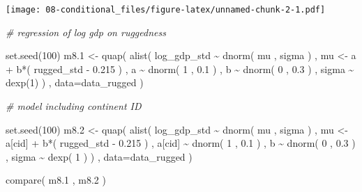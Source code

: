 \documentclass[
]{book}
\newenvironment{Shaded}{\begin{snugshade}}{\end{snugshade}}
\newcommand{\AttributeTok}[1]{\textcolor[rgb]{0.77,0.63,0.00}{#1}}
\newcommand{\CommentTok}[1]{\textcolor[rgb]{0.56,0.35,0.01}{\textit{#1}}}
\newcommand{\DecValTok}[1]{\textcolor[rgb]{0.00,0.00,0.81}{#1}}
\newcommand{\FloatTok}[1]{\textcolor[rgb]{0.00,0.00,0.81}{#1}}
\newcommand{\FunctionTok}[1]{\textcolor[rgb]{0.00,0.00,0.00}{#1}}
\newcommand{\NormalTok}[1]{#1}
\newcommand{\OtherTok}[1]{\textcolor[rgb]{0.56,0.35,0.01}{#1}}
\newcommand{\SpecialCharTok}[1]{\textcolor[rgb]{0.00,0.00,0.00}{#1}}
\begin{document}
\texttt{[image: 08-conditional\_files/figure-latex/unnamed-chunk-2-1.pdf]}

\begin{Shaded}
\begin{Highlighting}[]
\CommentTok{\# regression of log gdp on ruggedness}

\FunctionTok{set.seed}\NormalTok{(}\DecValTok{100}\NormalTok{)}
\NormalTok{m8}\FloatTok{.1} \OtherTok{\textless{}{-}} \FunctionTok{quap}\NormalTok{( }\FunctionTok{alist}\NormalTok{(}
\NormalTok{log\_gdp\_std }\SpecialCharTok{\textasciitilde{}} \FunctionTok{dnorm}\NormalTok{( mu , sigma ) , }
\NormalTok{mu }\OtherTok{\textless{}{-}}\NormalTok{ a }\SpecialCharTok{+}\NormalTok{ b}\SpecialCharTok{*}\NormalTok{( rugged\_std }\SpecialCharTok{{-}} \FloatTok{0.215}\NormalTok{ ) , }
\NormalTok{a }\SpecialCharTok{\textasciitilde{}} \FunctionTok{dnorm}\NormalTok{( }\DecValTok{1}\NormalTok{ , }\FloatTok{0.1}\NormalTok{ ) , }
\NormalTok{b }\SpecialCharTok{\textasciitilde{}} \FunctionTok{dnorm}\NormalTok{( }\DecValTok{0}\NormalTok{ , }\FloatTok{0.3}\NormalTok{ ) , sigma }\SpecialCharTok{\textasciitilde{}} \FunctionTok{dexp}\NormalTok{(}\DecValTok{1}\NormalTok{)}
\NormalTok{) , }\AttributeTok{data=}\NormalTok{data\_rugged )}

\CommentTok{\# model including continent ID}

\FunctionTok{set.seed}\NormalTok{(}\DecValTok{100}\NormalTok{)}
\NormalTok{m8}\FloatTok{.2} \OtherTok{\textless{}{-}} \FunctionTok{quap}\NormalTok{( }\FunctionTok{alist}\NormalTok{(}
\NormalTok{log\_gdp\_std }\SpecialCharTok{\textasciitilde{}} \FunctionTok{dnorm}\NormalTok{( mu , sigma ) , }
\NormalTok{mu }\OtherTok{\textless{}{-}}\NormalTok{ a[cid] }\SpecialCharTok{+}\NormalTok{ b}\SpecialCharTok{*}\NormalTok{( rugged\_std }\SpecialCharTok{{-}} \FloatTok{0.215}\NormalTok{ ) , }
\NormalTok{a[cid] }\SpecialCharTok{\textasciitilde{}} \FunctionTok{dnorm}\NormalTok{( }\DecValTok{1}\NormalTok{ , }\FloatTok{0.1}\NormalTok{ ) , }
\NormalTok{b }\SpecialCharTok{\textasciitilde{}} \FunctionTok{dnorm}\NormalTok{( }\DecValTok{0}\NormalTok{ , }\FloatTok{0.3}\NormalTok{ ) , }
\NormalTok{sigma }\SpecialCharTok{\textasciitilde{}} \FunctionTok{dexp}\NormalTok{( }\DecValTok{1}\NormalTok{ )}
\NormalTok{) , }\AttributeTok{data=}\NormalTok{data\_rugged )}

\FunctionTok{compare}\NormalTok{( m8}\FloatTok{.1}\NormalTok{ , m8}\FloatTok{.2}\NormalTok{ )}
\end{Highlighting}
\end{Shaded}
\end{document}
